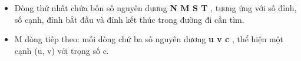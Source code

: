 \begin{itemize}
	\item     Dòng thứ nhất chứa bốn số nguyên dương    \textbf{     N M S T    }    , tương ứng với số đỉnh, số cạnh, đỉnh bắt đầu và đỉnh kết thúc trong đường đi cần tìm.   
	\item     M dòng tiếp theo: mỗi dòng chứ ba số nguyên dương    \textbf{     u v c    }    , thể hiện một cạnh (u, v) với trọng số c.   
\end{itemize}